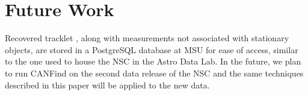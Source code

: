 \documentclass[twocolumn]{aastex62}
\begin{document}



 

 
\section{Future Work} 
\label{sec:future}

Recovered tracklet , along with measurements not associated with stationary objects, are stored in a PostgreSQL database at MSU for ease of access, similar to the one used to house the NSC in the Astro Data Lab.  In the future, we plan to run CANFind on the second data release of the NSC and the same techniques described in this paper will be applied to the new data.
\end{document}
